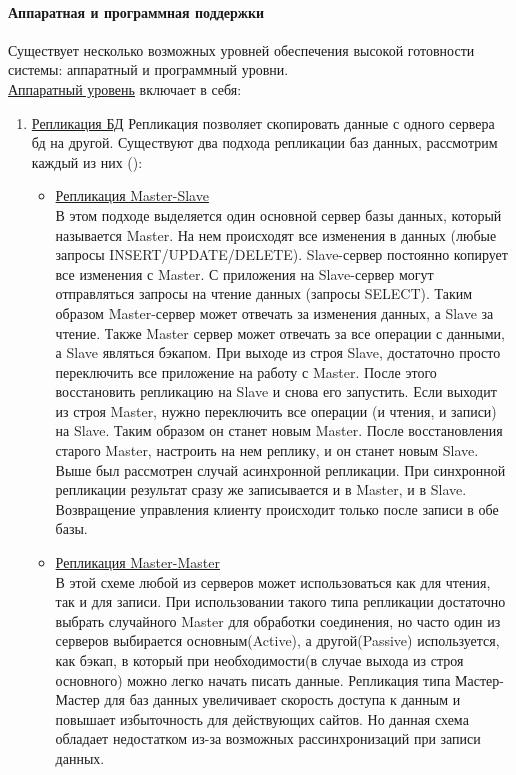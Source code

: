 \paragraph{Аппаратная и программная поддержки}
Существует несколько возможных уровней обеспечения высокой готовности системы: аппаратный и программный уровни. \\
\underline{Аппаратный уровень} включает в себя:
\begin{enumerate}
    \item \underline{Репликация БД}
    Репликация позволяет скопировать данные с одного сервера бд на другой.
    Существуют  два подхода репликации баз данных, рассмотрим каждый из них (\autocite{Gregorchenko}):
    \begin{itemize}
        \item \underline{Репликация Master-Slave} \\В этом подходе выделяется один основной сервер базы данных, который называется Master. На нем происходят все изменения в данных (любые запросы INSERT/UPDATE/DELETE). Slave-сервер постоянно копирует все изменения с Master. С приложения на Slave-сервер могут отправляться запросы на чтение данных (запросы SELECT). Таким образом Master-сервер может отвечать за изменения данных, а Slave за чтение. Также Master сервер может отвечать за все операции с данными, а Slave являться бэкапом. При выходе из строя Slave, достаточно просто переключить все приложение на работу с Master. После этого восстановить репликацию на Slave и снова его запустить. Если выходит из строя Master, нужно переключить все операции (и чтения, и записи) на Slave. Таким образом он станет новым Master. После восстановления старого Master, настроить на нем реплику, и он станет новым Slave.
        Выше был рассмотрен случай асинхронной репликации. При синхронной репликации результат сразу же записывается и в Master, и в Slave. Возвращение управления клиенту происходит только после записи в обе базы.
        \item \underline{Репликация Master-Master}\\ В этой схеме любой из серверов может использоваться как для чтения, так и для записи. При использовании такого типа репликации достаточно выбрать случайного Master для обработки соединения, но часто один из серверов выбирается основным(Active), а другой(Passive) используется, как бэкап, в который при необходимости(в случае выхода из строя основного) можно легко начать писать данные. Репликация типа Мастер-Мастер для баз данных увеличивает скорость доступа к данным и повышает избыточность для действующих сайтов. Но данная схема обладает недостатком из-за возможных рассинхронизаций при записи данных. 
    \end{itemize}  


\end{enumerate}
